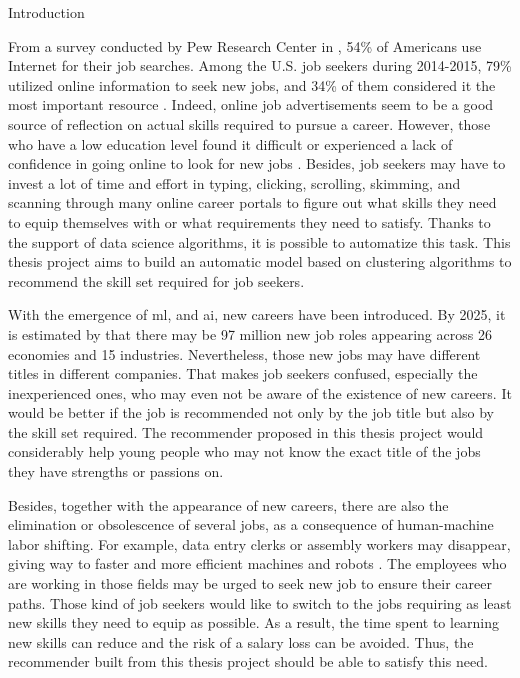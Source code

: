 \documentclass[a4paper,man,floatsintext,natbib,noextraspace]{apa6}
\makeatletter
\renewcommand{\section}{\@startsection {section}{1}
  {\z@}
  {\b@level@one@skip}
  {\e@level@one@skip}
  {\centering\normalfont\bfseries}}
\makeatother
\begin{document}
\clearpage

\section{Introduction}

From a survey conducted by Pew Research Center in \citeyear{smithSearchingWorkDigital2015}, 54\% of Americans use Internet for their job searches. Among the U.S. job seekers during 2014-2015, 79\% utilized online information to seek new jobs, and 34\% of them considered it the most important resource \citep{smithSearchingWorkDigital2015}. Indeed, online job advertisements seem to be a good source of reflection on actual skills required to pursue a career. However, those who have a low education level found it difficult or experienced a lack of confidence in going online to look for new jobs \citep{smithSearchingWorkDigital2015}. Besides, job seekers may have to invest a lot of time and effort in typing, clicking, scrolling, skimming, and scanning through many online career portals to figure out what skills they need to equip themselves with or what requirements they need to satisfy. Thanks to the support of data science algorithms, it is possible to automatize this task. This thesis project aims to build an automatic model based on clustering algorithms to recommend the skill set required for job seekers.

With the emergence of \gls{ml}, and \gls{ai}, new careers have been introduced. By 2025, it is estimated by \cite{worldeconomicforumFutureJobsReport2020} that there may be 97 million new job roles appearing across 26 economies and 15 industries. Nevertheless, those new jobs may have different titles in different companies. That makes job seekers confused, especially the inexperienced ones, who may even not be aware of the existence of new careers. It would be better if the job is recommended not only by the job title but also by the skill set required. The recommender proposed in this thesis project would considerably help young people who may not know the exact title of the jobs they have strengths or passions on. 

Besides, together with the appearance of new careers, there are also the elimination or obsolescence of several jobs, as a consequence of human-machine labor shifting. For example, data entry clerks or assembly workers may disappear, giving way to faster and more efficient machines and robots \citep{worldeconomicforumFutureJobsReport2020}. The employees who are working in those fields may be urged to seek new job to ensure their career paths. Those kind of job seekers would like to switch to the jobs requiring as least new skills they need to equip as possible. As a result, the time spent to learning new skills can reduce and the risk of a salary loss can be avoided. Thus, the recommender built from this thesis project should be able to satisfy this need.
\end{document}
